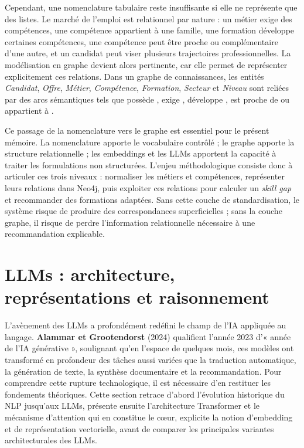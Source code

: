 \documentclass[12pt,twoside]{report}
\begin{document}
Cependant, une nomenclature tabulaire reste insuffisante si elle ne représente que des listes. Le marché de l'emploi est relationnel par nature : un métier exige des compétences, une compétence appartient à une famille, une formation développe certaines compétences, une compétence peut être proche ou complémentaire d'une autre, et un candidat peut viser plusieurs trajectoires professionnelles. La modélisation en graphe devient alors pertinente, car elle permet de représenter explicitement ces relations. Dans un graphe de connaissances, les entités \textit{Candidat}, \textit{Offre}, \textit{Métier}, \textit{Compétence}, \textit{Formation}, \textit{Secteur} et \textit{Niveau} sont reliées par des arcs sémantiques tels que \og possède \fg{}, \og exige \fg{}, \og développe \fg{}, \og est proche de \fg{} ou \og appartient à \fg{}.

Ce passage de la nomenclature vers le graphe est essentiel pour le présent mémoire. La nomenclature apporte le vocabulaire contrôlé ; le graphe apporte la structure relationnelle ; les embeddings et les LLMs apportent la capacité à traiter les formulations non structurées. L'enjeu méthodologique consiste donc à articuler ces trois niveaux : normaliser les métiers et compétences, représenter leurs relations dans Neo4j, puis exploiter ces relations pour calculer un \emph{skill gap} et recommander des formations adaptées. Sans cette couche de standardisation, le système risque de produire des correspondances superficielles ; sans la couche graphe, il risque de perdre l'information relationnelle nécessaire à une recommandation explicable.
\section{LLMs : architecture, représentations et raisonnement}
L'avènement des LLMs a profondément redéfini le champ de l'IA appliquée au langage. \textbf{Alammar et Grootendorst} (2024) qualifient l'année 2023 d'« année de l'IA générative », soulignant qu'en l'espace de quelques mois, ces modèles ont transformé en profondeur des tâches aussi variées que la traduction automatique, la génération de texte, la synthèse documentaire et la recommandation. Pour comprendre cette rupture technologique, il est nécessaire d'en restituer les fondements théoriques. Cette section retrace d'abord l'évolution historique du NLP jusqu'aux LLMs, présente ensuite l'architecture Transformer et le mécanisme d'attention qui en constitue le cœur, explicite la notion d'embedding et de représentation vectorielle, avant de comparer les principales variantes architecturales des LLMs.
\end{document}
